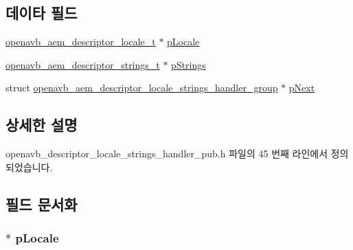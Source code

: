 \subsection*{데이타 필드}
\begin{DoxyCompactItemize}
\item 
\hyperlink{structopenavb__aem__descriptor__locale__t}{openavb\+\_\+aem\+\_\+descriptor\+\_\+locale\+\_\+t} $\ast$ \hyperlink{structopenavb__aem__descriptor__locale__strings__handler__group_a9861e894663d7ca861915d7060501d48}{p\+Locale}
\item 
\hyperlink{structopenavb__aem__descriptor__strings__t}{openavb\+\_\+aem\+\_\+descriptor\+\_\+strings\+\_\+t} $\ast$ \hyperlink{structopenavb__aem__descriptor__locale__strings__handler__group_a81090c0301cd642eb9693980b69b98f0}{p\+Strings}
\item 
struct \hyperlink{structopenavb__aem__descriptor__locale__strings__handler__group}{openavb\+\_\+aem\+\_\+descriptor\+\_\+locale\+\_\+strings\+\_\+handler\+\_\+group} $\ast$ \hyperlink{structopenavb__aem__descriptor__locale__strings__handler__group_a5875a7a829d125ac84c4e38192999754}{p\+Next}
\end{DoxyCompactItemize}


\subsection{상세한 설명}


openavb\+\_\+descriptor\+\_\+locale\+\_\+strings\+\_\+handler\+\_\+pub.\+h 파일의 45 번째 라인에서 정의되었습니다.



\subsection{필드 문서화}
\subsubsection[{\texorpdfstring{p\+Locale}{pLocale}}]{$\ast$ p\+Locale}\hypertarget{structopenavb__aem__descriptor__locale__strings__handler__group_a9861e894663d7ca861915d7060501d48}{}\label{structopenavb__aem__descriptor__locale__strings__handler__group_a9861e894663d7ca861915d7060501d48}


